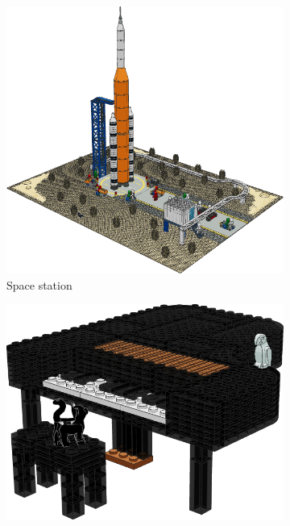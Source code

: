 \documentclass{PDS}
\begin{document}
\begin{figure}[htbp]
    \centering
    \begin{subfigure}[b]{0.3\textwidth}
        \includegraphics[width=\textwidth]{./figures/space.png}
        \caption{Space station}
        \label{fig:rocket}
    \end{subfigure}
    \hfill
    \begin{subfigure}[b]{0.3\textwidth}
        \includegraphics[width=\textwidth]{./figures/piano.png}

\end{subfigure}
\end{figure}
\end{document}
